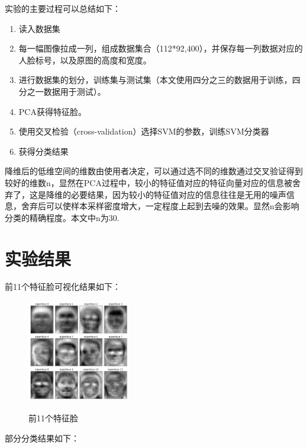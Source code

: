 \documentclass[UTF8]{ctexart}
\begin{document}
实验的主要过程可以总结如下：

\begin{enumerate}
	\item 读入数据集
	\item 每一幅图像拉成一列，组成数据集合（112*92,400），并保存每一列数据对应的人脸标号，以及原图的高度和宽度。
	\item 进行数据集的划分，训练集与测试集（本文使用四分之三的数据用于训练，四分之一数据用于测试）。
	\item PCA获得特征脸。
	\item 使用交叉检验（cross-validation）选择SVM的参数，训练SVM分类器
	\item 获得分类结果
\end{enumerate}



降维后的低维空间的维数由使用者决定，可以通过选不同的维数通过交叉验证得到较好的维数n，显然在PCA过程中，较小的特征值对应的特征向量对应的信息被舍弃了，这是降维的必要结果，因为较小的特征值对应的信息往往是无用的噪声信息，舍弃后可以使样本采样密度增大，一定程度上起到去噪的效果。显然n会影响分类的精确程度。本文中n为30.

\newpage
\section{实验结果}

前11个特征脸可视化结果如下：

	\begin{figure}[H]
	  \centering
	  \label{fig:Per6A}\includegraphics[width=0.4\textwidth]{eigenface.png}\
	  \caption{前11个特征脸}
	  \label{fig:oscil}
	\end{figure}


部分分类结果如下：
\end{document}
